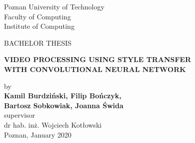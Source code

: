 
\begin{titlepage}
	
	
	\thispagestyle{frontpage}
	
	\begin{center}
		

		\vspace{0,5\baselineskip}
		\large{Poznan University of Technology}\\
		\large{Faculty of Computing}\\
        \large{Institute of Computing}\\
        
        \vspace*{4,5\baselineskip}
        
	    \large {BACHELOR THESIS}\\
		\vspace*{1,5\baselineskip}
		
		\LARGE{\textbf{VIDEO PROCESSING USING STYLE TRANSFER}}\\
		\Large{\textbf{WITH CONVOLUTIONAL NEURAL NETWORK}}\\
		
        \vspace*{1,5\baselineskip}

        \large{by}\\
		\large{\textbf{Kamil Burdziński, Filip Bończyk, \\Bartosz Sobkowiak, Joanna Świda}}\\
		\vspace{1,5\baselineskip}
		\large{supervisor}\\
		\large{{dr hab. inż. Wojciech Kotłowski }}\\
		
		\vspace*{\fill}
		\large{{Poznan, January 2020}}\\

	\end{center}
	
	\vspace*{4\baselineskip}

	
\end{titlepage}